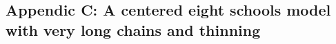 \documentclass[american,]{article}
\let\oldparagraph\paragraph
\renewcommand{\paragraph}[1]{\oldparagraph{#1}\mbox{}}
\begin{document}







\hypertarget{a-centered-eight-schools-model-1}{%
\subsection*{Appendic C: A centered eight schools model with very long chains and
thinning}\label{a-centered-eight-schools-model-1}}

\end{document}
